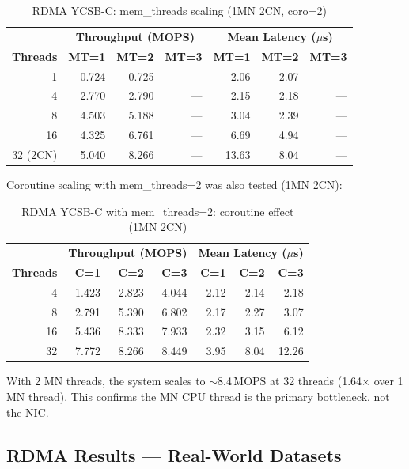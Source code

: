 \documentclass[11pt,a4paper]{article}
\begin{document}
\begin{table}[H]
\centering
\caption{RDMA YCSB-C: mem\_threads scaling (1MN 2CN, coro=2)}
\label{tab:rdma-memthreads}
\small
\begin{tabular}{@{}rrrr|rrr@{}}
\toprule
& \multicolumn{3}{c|}{\textbf{Throughput (MOPS)}} & \multicolumn{3}{c}{\textbf{Mean Latency ($\mu$s)}} \\
\textbf{Threads} & \textbf{MT=1} & \textbf{MT=2} & \textbf{MT=3} & \textbf{MT=1} & \textbf{MT=2} & \textbf{MT=3} \\
\midrule
1  & 0.724  & 0.725  & ---    & 2.06  & 2.07  & --- \\
4  & 2.770  & 2.790  & ---    & 2.15  & 2.18  & --- \\
8  & 4.503  & 5.188  & ---    & 3.04  & 2.39  & --- \\
16 & 4.325  & 6.761  & ---    & 6.69  & 4.94  & --- \\
32 (2CN) & 5.040 & 8.266 & --- & 13.63 & 8.04 & --- \\
\bottomrule
\end{tabular}
\end{table}

Coroutine scaling with mem\_threads=2 was also tested (1MN 2CN):

\begin{table}[H]
\centering
\caption{RDMA YCSB-C with mem\_threads=2: coroutine effect (1MN 2CN)}
\label{tab:rdma-mt2-coro}
\small
\begin{tabular}{@{}rrrr|rrr@{}}
\toprule
& \multicolumn{3}{c|}{\textbf{Throughput (MOPS)}} & \multicolumn{3}{c}{\textbf{Mean Latency ($\mu$s)}} \\
\textbf{Threads} & \textbf{C=1} & \textbf{C=2} & \textbf{C=3} & \textbf{C=1} & \textbf{C=2} & \textbf{C=3} \\
\midrule
4  & 1.423 & 2.823 & 4.044 & 2.12 & 2.14 & 2.18 \\
8  & 2.791 & 5.390 & 6.802 & 2.17 & 2.27 & 3.07 \\
16 & 5.436 & 8.333 & 7.933 & 2.32 & 3.15 & 6.12 \\
32 & 7.772 & 8.266 & 8.449 & 3.95 & 8.04 & 12.26 \\
\bottomrule
\end{tabular}
\end{table}

With 2 MN threads, the system scales to $\sim$8.4\,MOPS at 32 threads (1.64$\times$ over 1 MN thread). This confirms the MN CPU thread is the primary bottleneck, not the NIC.

\subsection{RDMA Results --- Real-World Datasets}
\end{document}
